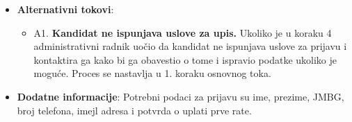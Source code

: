 \begin{itemize}
  \item \textbf{Alternativni tokovi}:
      \begin{itemize}
        \item A1. \textbf{Kandidat ne ispunjava uslove za upis.}
        Ukoliko je u koraku 4 administrativni radnik uočio da kandidat ne ispunjava uslove za prijavu i kontaktira ga kako bi ga obavestio o tome i ispravio podatke ukoliko je moguće. Proces se nastavlja u 1. koraku osnovnog toka.
      \end{itemize}

  \item \textbf{Dodatne informacije}:
  Potrebni podaci za prijavu su ime, prezime, JMBG, broj telefona, imejl adresa i potvrda o uplati prve rate.
\end{itemize}



